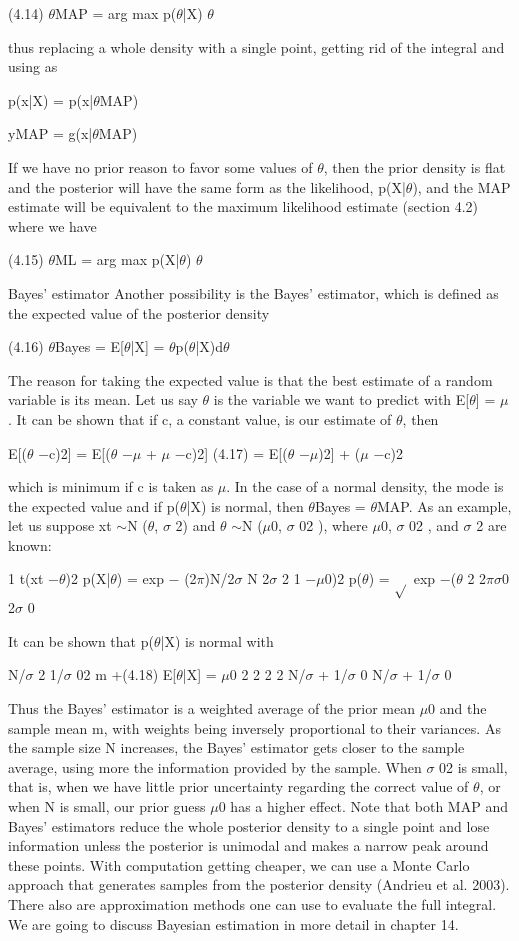 (4.14) $\theta$MAP = arg max p($\theta$|X) $\theta$

thus replacing a whole density with a single point, getting rid of the integral and using as

p(x|X) = p(x|$\theta$MAP)

yMAP = g(x|$\theta$MAP)

If we have no prior reason to favor some values of $\theta$, then the prior density is flat and the posterior will have the same form as the likelihood, p(X|$\theta$), and the MAP estimate will be equivalent to the maximum likelihood estimate (section 4.2) where we have

(4.15) $\theta$ML = arg max p(X|$\theta$) $\theta$

Bayes’ estimator Another possibility is the Bayes’ estimator, which is defined as the expected value of the posterior density

(4.16) $\theta$Bayes = E[$\theta$|X] = $\theta$p($\theta$|X)d$\theta$

The reason for taking the expected value is that the best estimate of a random variable is its mean. Let us say $\theta$ is the variable we want to predict with E[$\theta$] = $\mu$. It can be shown that if c, a constant value, is our estimate of $\theta$, then

E[($\theta$ $-$c)2] = E[($\theta$ $-$$\mu$ + $\mu$ $-$c)2] (4.17) = E[($\theta$ $-$$\mu$)2] + ($\mu$ $-$c)2

which is minimum if c is taken as $\mu$. In the case of a normal density, the mode is the expected value and if p($\theta$|X) is normal, then $\theta$Bayes = $\theta$MAP. As an example, let us suppose xt $\sim$N ($\theta$, $\sigma$ 2) and $\theta$ $\sim$N ($\mu$0, $\sigma$ 02 ), where $\mu$0, $\sigma$ 02 , and $\sigma$ 2 are known:

1 t(xt $-$$\theta$)2 p(X|$\theta$) = exp $-$ (2$\pi$)N/2$\sigma$ N 2$\sigma$ 2 1 $-$$\mu$0)2 p($\theta$) = $\sqrt{}$ exp $-$($\theta$ 2 2$\pi$$\sigma$0 2$\sigma$ 0

It can be shown that p($\theta$|X) is normal with

N/$\sigma$ 2 1/$\sigma$ 02 m +(4.18) E[$\theta$|X] = $\mu$0 2 2 2 2 N/$\sigma$ + 1/$\sigma$ 0 N/$\sigma$ + 1/$\sigma$ 0

Thus the Bayes’ estimator is a weighted average of the prior mean $\mu$0 and the sample mean m, with weights being inversely proportional to their variances. As the sample size N increases, the Bayes’ estimator gets closer to the sample average, using more the information provided by the sample. When $\sigma$ 02 is small, that is, when we have little prior uncertainty regarding the correct value of $\theta$, or when N is small, our prior guess $\mu$0 has a higher effect. Note that both MAP and Bayes’ estimators reduce the whole posterior density to a single point and lose information unless the posterior is unimodal and makes a narrow peak around these points. With computation getting cheaper, we can use a Monte Carlo approach that generates samples from the posterior density (Andrieu et al. 2003). There also are approximation methods one can use to evaluate the full integral. We are going to discuss Bayesian estimation in more detail in chapter 14.

